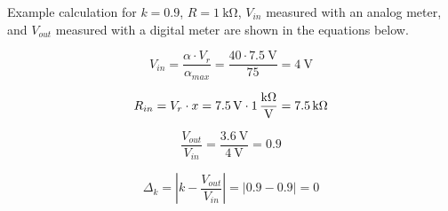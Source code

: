 Example calculation for $k = 0.9$, $R = \SI{1}{\kilo\ohm}$, $V_{in}$ measured with an analog meter, and $V_{out}$ measured with a digital meter are shown in the equations below.

\begin{equation}
	V_{in} = \frac{\alpha\cdot V_r}{\alpha_{max}} = \frac{40\cdot\SI{7.5}{\volt}}{75} = \SI{4}{\volt}	
\end{equation}

\begin{equation}
	R_{in} = V_r\cdot x = \SI{7.5}{\volt}\cdot \SI{1}{\frac{\kilo\ohm}{\volt}} = \SI{7.5}{\kilo\ohm}
\end{equation}

\begin{equation}
	\frac{V_{out}}{V_{in}} = \frac{\SI{3.6}{\volt}}{\SI{4}{\volt}} = 0.9
\end{equation}

\begin{equation}
	\Delta_k = | k - \frac{V_{out}}{V_{in}}| = |0.9 - 0.9| = 0
\end{equation}